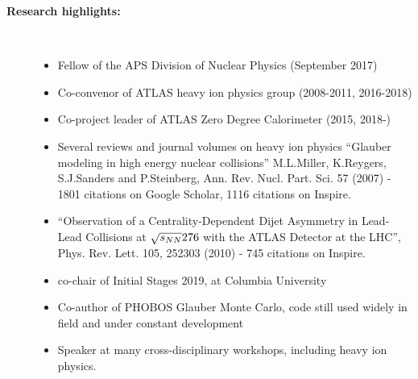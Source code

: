 \documentclass[11 pt]{article}
\begin{document}
\newpage
\begin{description}
\item[\bf Research highlights:]\
\begin{itemize}
\item Fellow of the APS Division of Nuclear Physics (September 2017)
\item Co-convenor of ATLAS heavy ion physics group (2008-2011, 2016-2018)
\item Co-project leader of ATLAS Zero Degree Calorimeter (2015, 2018-)
\item Several reviews and journal volumes on heavy ion physics ``Glauber modeling in high energy nuclear collisions'' M.L.Miller, K.Reygers, S.J.Sanders and P.Steinberg, Ann. Rev. Nucl. Part. Sci. 57 (2007) - 1801 citations on Google Scholar, 1116 citations on Inspire.
\item ``Observation of a Centrality-Dependent Dijet Asymmetry in Lead-Lead Collisions at $\sqrt{s_{NN}}276$ with the ATLAS Detector at the LHC'', Phys. Rev. Lett. 105, 252303 (2010) - 745 citations on Inspire.
\item co-chair of Initial Stages 2019, at Columbia University
\item Co-author of PHOBOS Glauber Monte Carlo, code still used widely in field and under constant development
\item Speaker at many cross-disciplinary workshops, including heavy ion physics.
\end{itemize}
\end{description}

\newpage
\end{document}
